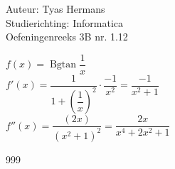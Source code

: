 \documentclass[a4paper]{article}
\begin{document}
  
\noindent \large Auteur: Tyas Hermans \\
\noindent \large Studierichting: Informatica\\
\noindent \large Oefeningenreeks 3B nr. 1.12\\

\medskip

\normalsize

$f(x) = \operatorname{Bgtan}\dfrac{1}{x}$\\

$f'(x) = \dfrac{1}{1+\left(\dfrac{1}{x}\right)^2}\cdot\dfrac{-1}{x^2} = \dfrac{-1}{x^2+1}$\\

$f''(x) = \dfrac{(2x)}{(x^2+1)^2} = \dfrac{2x}{x^4+2x^2+1}$\\



\begin{thebibliography}{999}
\end{thebibliography}
\end{document}
